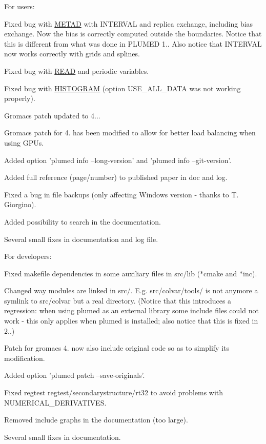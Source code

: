 For users\+:
\begin{DoxyItemize}
\item Fixed bug with \hyperlink{METAD}{M\+E\+T\+A\+D} with I\+N\+T\+E\+R\+V\+A\+L and replica exchange, including bias exchange. Now the bias is correctly computed outside the boundaries. Notice that this is different from what was done in P\+L\+U\+M\+E\+D 1.. Also notice that I\+N\+T\+E\+R\+V\+A\+L now works correctly with grids and splines.
\item Fixed bug with \hyperlink{READ}{R\+E\+A\+D} and periodic variables.
\item Fixed bug with \hyperlink{HISTOGRAM}{H\+I\+S\+T\+O\+G\+R\+A\+M} (option U\+S\+E\+\_\+\+A\+L\+L\+\_\+\+D\+A\+T\+A was not working properly).
\item Gromacs patch updated to 4...
\item Gromacs patch for 4. has been modified to allow for better load balancing when using G\+P\+Us.
\item Added option 'plumed info --long-\/version' and 'plumed info --git-\/version'.
\item Added full reference (page/number) to published paper in doc and log.
\item Fixed a bug in file backups (only affecting Windows version -\/ thanks to T. Giorgino).
\item Added possibility to search in the documentation.
\item Several small fixes in documentation and log file.
\end{DoxyItemize}

For developers\+:
\begin{DoxyItemize}
\item Fixed makefile dependencies in some auxiliary files in src/lib ($\ast$cmake and $\ast$inc).
\item Changed way modules are linked in src/. E.\+g. src/colvar/tools/ is not anymore a symlink to src/colvar but a real directory. (Notice that this introduces a regression\+: when using plumed as an external library some include files could not work -\/ this only applies when plumed is installed; also notice that this is fixed in 2..)
\item Patch for gromacs 4. now also include original code so as to simplify its modification.
\item Added option 'plumed patch --save-\/originals'.
\item Fixed regtest regtest/secondarystructure/rt32 to avoid problems with N\+U\+M\+E\+R\+I\+C\+A\+L\+\_\+\+D\+E\+R\+I\+V\+A\+T\+I\+V\+E\+S.
\item Removed include graphs in the documentation (too large).
\item Several small fixes in documentation.
\end{DoxyItemize}

